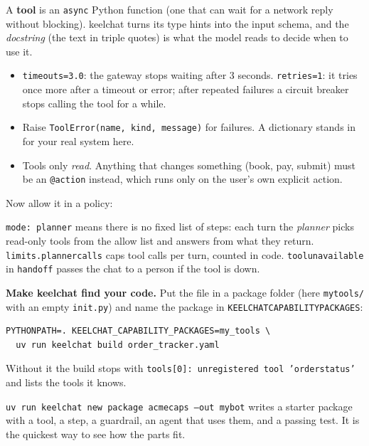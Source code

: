 \documentclass[11pt,a4paper]{article}
\newcommand{\snip}[1]{}
\newcommand{\codeus}{\textunderscore\allowbreak}
\newcommand{\code}[1]{{\renewcommand{\_}{\codeus}\texttt{\upshape #1}}}
\newcommand{\key}[1]{{\renewcommand{\_}{\codeus}\texttt{\color{ckey}#1}}}
\begin{document}
A \textbf{tool} is an \code{async} Python function (one that can wait for a network reply without blocking).
keelchat turns its type hints into the input schema, and the \emph{docstring} (the text in triple quotes) is what
the model reads to decide when to use it.



\begin{itemize}[leftmargin=1.2em]
  \item \code{timeout\_s=3.0}: the gateway stops waiting after 3 seconds. \code{retries=1}: it tries once more after
    a timeout or error; after repeated failures a circuit breaker stops calling the tool for a while.
  \item Raise \code{ToolError(name, kind, message)} for failures. A dictionary stands in for your real system here.
  \item Tools only \emph{read}. Anything that changes something (book, pay, submit) must be an
    \code{@action} instead, which runs only on the user's own explicit action.
\end{itemize}

Now allow it in a policy:

\snip{07_tool.yaml}

\code{mode: planner} means there is no fixed list of steps: each turn the \emph{planner} picks read-only tools from the
allow list and answers from what they return. \key{limits.planner\_calls} caps tool calls per turn, counted in code.
\code{tool\_unavailable} in \key{handoff} passes the chat to a person if the tool is down.

\textbf{Make keelchat find your code.} Put the file in a package folder (here \code{my\_tools/} with an empty
\code{\_\_init\_\_.py}) and name the package in \code{KEELCHAT\_CAPABILITY\_PACKAGES}:

\begin{lstlisting}[style=bashstyle]
PYTHONPATH=. KEELCHAT_CAPABILITY_PACKAGES=my_tools \
  uv run keelchat build order_tracker.yaml
\end{lstlisting}

Without it the build stops with \code{tools[0]: unregistered tool 'order\_status'} and lists the tools it knows.

\begin{tip}
\code{uv run keelchat new package acme\_caps --out my\_bot} writes a starter package with a tool, a step, a
guardrail, an agent that uses them, and a passing test. It is the quickest way to see how the parts fit.
\end{tip}
\end{document}
